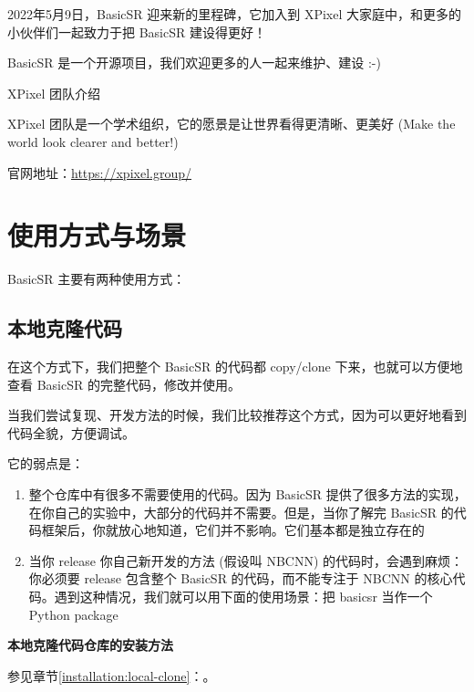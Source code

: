 \documentclass[../main.tex]{subfiles}
\begin{document}
2022年5月9日，BasicSR 迎来新的里程碑，它加入到 XPixel 大家庭中，和更多的小伙伴们一起致力于把 BasicSR 建设得更好！

BasicSR 是一个开源项目，我们欢迎更多的人一起来维护、建设 :-)

\begin{exampleBox}[]{XPixel 团队介绍}

    XPixel 团队是一个学术组织，它的愿景是让世界看得更清晰、更美好 (Make the world look clearer and better!)

    官网地址：\url{https://xpixel.group/}
\end{exampleBox}

\section{使用方式与场景}\label{overview:scenario}

BasicSR 主要有两种使用方式：

\subsection{本地克隆代码}\label{overview:local-clone}

在这个方式下，我们把整个 BasicSR 的代码都 copy/clone 下来，也就可以方便地查看 BasicSR 的完整代码，修改并使用。

当我们尝试复现、开发方法的时候，我们比较推荐这个方式，因为可以更好地看到代码全貌，方便调试。

它的弱点是：

\begin{enumerate}
    \item 整个仓库中有很多不需要使用的代码。因为 BasicSR 提供了很多方法的实现，在你自己的实验中，大部分的代码并不需要。但是，当你了解完 BasicSR 的代码框架后，你就放心地知道，它们并不影响。它们基本都是独立存在的
    \item 当你 release 你自己新开发的方法 (假设叫 NBCNN) 的代码时，会遇到麻烦：你必须要 release 包含整个 BasicSR 的代码，而不能专注于 NBCNN 的核心代码。遇到这种情况，我们就可以用下面的使用场景：把 basicsr 当作一个 Python package
\end{enumerate}

\begin{note} %
    \textbf{本地克隆代码仓库的安装方法}

    参见章节\ref{installation:local-clone}：。
\end{note}
\end{document}
